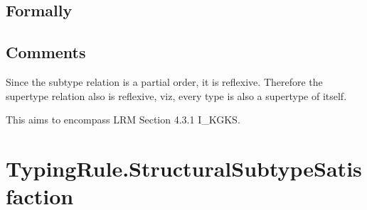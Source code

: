 \documentclass{book}
\begin{document}
  \subsection{Formally}

  \subsection{Comments}
  Since the subtype relation is a partial order, it is reflexive. Therefore the
  supertype relation also is reflexive, viz, every type is also a supertype of
  itself.

  This aims to encompass LRM Section 4.3.1 I\_KGKS.

\section{TypingRule.StructuralSubtypeSatisfaction}
\end{document}
